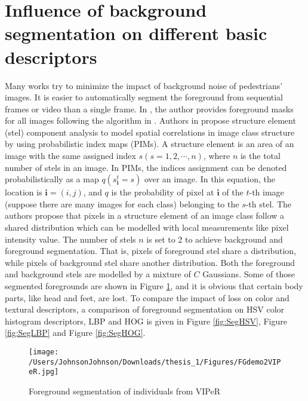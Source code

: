 \section{Influence of background segmentation on different basic descriptors}
Many works try to minimize the impact of background noise of pedestrians' images. It is easier to automatically segment the foreground from sequential frames or video than a single frame. In \cite{SDALF}, the author provides foreground masks for all images following the algorithm in \cite{STEL}. Authors in \cite{STEL} propose structure element (stel) component analysis to model spatial correlations in image class structure by using probabilistic index maps (PIMs). A structure element is an area of an image with the same assigned index $s(s=1,2,\cdots,n)$, where $n$ is the total number of stels in an image. In PIMs, the indices assignment can be denoted probabilistically as a map $q(s_{\bm{i}}^t=s)$ over an image. In this equation, the location is $\bm{i} = (i,j)$, and $q$ is the probability of pixel at $\bm{i}$ of the $t$-th image (suppose there are many images for each class) belonging to the $s$-th stel. The authors propose that pixels in a structure element of an image class follow a shared distribution which can be modelled with local measurements like pixel intensity value. The number of stels $n$ is set to 2 to achieve background and foreground segmentation. That is, pixels of foreground stel share a distribution, while pixels of background stel share another distribution. Both the foreground and background stels are modelled by a mixture of $C$ Gaussians. Some of those segmented foregrounds are shown in Figure \ref{VIPeRFGs}, and it is obvious that certain body parts, like head and feet, are lost. To compare the impact of loss on color and textural descriptors, a comparison of foreground segmentation on HSV color histogram descriptors, LBP and HOG is given in Figure \ref{fig:SegHSV}, Figure \ref{fig:SegLBP} and Figure \ref{fig:SegHOG}. 


\begin{figure}[H]
\centering
\texttt{[image: /Users/JohnsonJohnson/Downloads/thesis\_1/Figures/FGdemo2VIPeR.jpg]}
\caption{Foreground segmentation of individuals from VIPeR }
\label{VIPeRFGs}
\vspace{0em}
\end{figure} 

